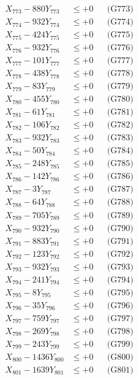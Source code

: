 \documentclass[a4paper,10pt]{article}
\begin{document}
{\begin{align}
X_{773} - 880Y_{773} &\leq +0 && \text{(G773)} \\
X_{774} - 932Y_{774} &\leq +0 && \text{(G774)} \\
X_{775} - 424Y_{775} &\leq +0 && \text{(G775)} \\
X_{776} - 932Y_{776} &\leq +0 && \text{(G776)} \\
X_{777} - 101Y_{777} &\leq +0 && \text{(G777)} \\
X_{778} - 438Y_{778} &\leq +0 && \text{(G778)} \\
X_{779} - 83Y_{779} &\leq +0 && \text{(G779)} \\
X_{780} - 455Y_{780} &\leq +0 && \text{(G780)} \\
\allowbreak
X_{781} - 61Y_{781} &\leq +0 && \text{(G781)} \\
X_{782} - 106Y_{782} &\leq +0 && \text{(G782)} \\
X_{783} - 932Y_{783} &\leq +0 && \text{(G783)} \\
X_{784} - 50Y_{784} &\leq +0 && \text{(G784)} \\
X_{785} - 248Y_{785} &\leq +0 && \text{(G785)} \\
X_{786} - 142Y_{786} &\leq +0 && \text{(G786)} \\
X_{787} - 3Y_{787} &\leq +0 && \text{(G787)} \\
X_{788} - 64Y_{788} &\leq +0 && \text{(G788)} \\
X_{789} - 705Y_{789} &\leq +0 && \text{(G789)} \\
X_{790} - 932Y_{790} &\leq +0 && \text{(G790)} \\
\allowbreak
X_{791} - 883Y_{791} &\leq +0 && \text{(G791)} \\
X_{792} - 123Y_{792} &\leq +0 && \text{(G792)} \\
X_{793} - 932Y_{793} &\leq +0 && \text{(G793)} \\
X_{794} - 241Y_{794} &\leq +0 && \text{(G794)} \\
X_{795} - 8Y_{795} &\leq +0 && \text{(G795)} \\
X_{796} - 35Y_{796} &\leq +0 && \text{(G796)} \\
X_{797} - 759Y_{797} &\leq +0 && \text{(G797)} \\
X_{798} - 269Y_{798} &\leq +0 && \text{(G798)} \\
X_{799} - 243Y_{799} &\leq +0 && \text{(G799)} \\
X_{800} - 1436Y_{800} &\leq +0 && \text{(G800)} \\
\allowbreak
X_{801} - 1639Y_{801} &\leq +0 && \text{(G801)} \\

\end{align}}
\end{document}
